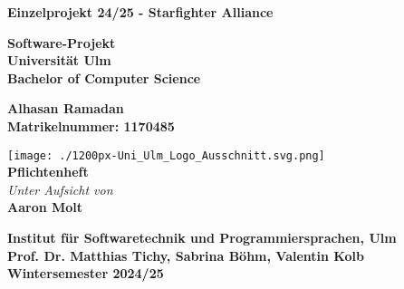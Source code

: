 \documentclass[10pt]{article}
\begin{document}
\thispagestyle{empty}

\begin{titlepage}
	\begin{center}
		\begin{LARGE}
		\bf{Einzelprojekt 24/25 - Starfighter Alliance\\}
		\end{LARGE}
		\vspace{40pt}
		
		\vspace{15pt}
		\textbf{\Large Software-Projekt\\}
		\vspace{6pt}
		\textbf{\Large Universität Ulm}\\
		\vspace{6pt}
		\textbf{\Large Bachelor of Computer Science}\\
		\vspace{20pt}
		
		\textbf{\large
			Alhasan Ramadan\\
			Matrikelnummer: 1170485}
		\vspace{40pt}
		
		\texttt{[image: ./1200px-Uni\_Ulm\_Logo\_Ausschnitt.svg.png]} \\[45pt]
		
		\vspace{35pt} %
		\textbf{\Large Pflichtenheft}\\
		\textit{Unter Aufsicht von}\\
		\textbf{\large Aaron Molt}\\
		
		
		\vspace{40pt}
		
		
		\textbf{\large Institut für Softwaretechnik und Programmiersprachen, Ulm\\
			Prof. Dr. Matthias Tichy, Sabrina Böhm, Valentin Kolb\\
			Wintersemester 2024/25
		}\\
	\end{center}
\end{titlepage}
\end{document}
